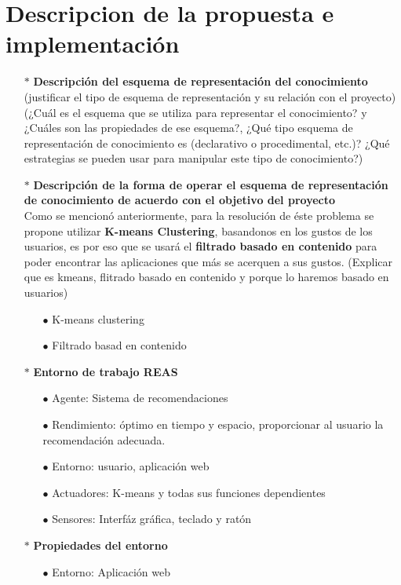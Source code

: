 \documentclass[10pt, a4paper]{article}
\begin{document}
\section{Descripcion de la propuesta e implementaci\'on}
\begin{enumerate}
\item[$\ast$]\textbf{Descripci\'on del esquema de representaci\'on del conocimiento} (justificar el tipo de esquema de representaci\'on y su relaci\'on con el proyecto) (¿Cuál es el esquema que se utiliza para representar el conocimiento? y ¿Cuáles son las propiedades de ese esquema?, ¿Qué tipo esquema de representación de conocimiento es (declarativo o procedimental, etc.)? ¿Qué estrategias se pueden usar para manipular este tipo de conocimiento?)
\item[$\ast$]\textbf{Descripci\'on de la forma de operar el esquema de representaci\'on de conocimiento de acuerdo con el objetivo del proyecto}\\
Como se mencion\'o anteriormente, para la resoluci\'on de \'este problema se propone utilizar \textbf{K-means Clustering}, basandonos en los gustos de los usuarios, es por eso que se usar\'a el \textbf{filtrado basado en contenido} para poder encontrar las aplicaciones que m\'as se acerquen a sus gustos. (Explicar que es kmeans, flitrado basado en contenido y porque lo haremos basado en usuarios)
\begin{enumerate}
\item[$\bullet$]K-means clustering
\item[$\bullet$]Filtrado basad en contenido
\end{enumerate}
\item[$\ast$]\textbf{Entorno de trabajo REAS}
\begin{enumerate}
\item[$\bullet$]Agente: Sistema de recomendaciones
\item[$\bullet$]Rendimiento: \'optimo en tiempo y espacio, proporcionar al usuario la recomendaci\'on adecuada.
\item[$\bullet$]Entorno: usuario, aplicaci\'on web
\item[$\bullet$]Actuadores: K-means y todas sus funciones dependientes
\item[$\bullet$]Sensores: Interf\'az gr\'afica, teclado y rat\'on
\end{enumerate}
\item[$\ast$]\textbf{Propiedades del entorno}
\begin{enumerate}
\item[$\bullet$]Entorno: Aplicaci\'on web

\end{enumerate}
\end{enumerate}
\end{document}
